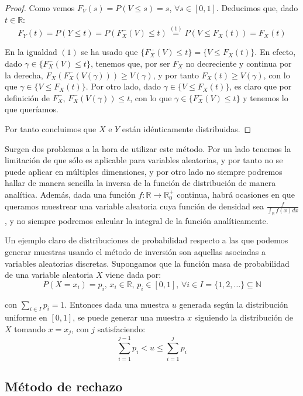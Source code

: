 \begin{proof}
Como vemos $F_V(s) = P(V\leq s) = s$, $\forall s\in [0,1]$. Deducimos que, dado $t\in \mathds{R}$:
$$F_Y(t) = P(Y\leq t) = P(F_X^-(V)\leq t) \overset{(1)}{=} P(V\leq F_X(t)) = F_X(t)$$

En la igualdad $(1)$ se ha usado que $\{F_X^-(V)\leq t\} = \{V\leq F_X(t)\}$. En efecto, dado $\gamma \in \{F_X^-(V)\leq t\}$, tenemos que, por ser $F_X$ no decreciente y continua por la derecha, $F_X(F_X^-(V(\gamma)))\geq V(\gamma)$, y por tanto $F_X(t)\geq V(\gamma)$, con lo que $\gamma\in \{V\leq F_X(t)\}$. Por otro lado, dado $\gamma \in \{V\leq F_X(t)\}$, es claro que por definición de $F_X^-$, $F_X^-(V(\gamma))\leq t$, con lo que $\gamma \in \{F_X^-(V)\leq t\}$ y tenemos lo que queríamos.

Por tanto concluimos que $X$ e $Y$ están idénticamente distribuidas.

\end{proof}

Surgen dos problemas a la hora de utilizar este método. Por un lado tenemos la limitación de que sólo es aplicable para variables aleatorias, y por tanto no se puede aplicar en múltiples dimensiones, y por otro lado no siempre podremos hallar de manera sencilla la inversa de la función de distribución de manera analítica. Además, dada una función $f:\mathds{R}\rightarrow \mathds{R}_0^+$ continua, habrá ocasiones en que queramos muestrear una variable aleatoria cuya función de densidad sea $\frac{f}{\int_{\mathds{R}}f(x)dx}$, y no siempre podremos calcular la integral de la función analíticamente.

\begin{ejemplo}
Un ejemplo claro de distribuciones de probabilidad respecto a las que podemos generar muestras usando el método de inversión son aquellas asociadas a variables aleatorias discretas. Supongamos que la función masa de probabilidad de una variable aleatoria $X$ viene dada por:
$$P(X=x_i) = p_i\text{, }x_i\in\mathds{R} \text{, }p_i\in [0,1]\text{, }\forall i\in I=\{1,2,\ldots \}\subseteq\mathds{N}$$

con $\sum_{i\in I}p_i = 1$. Entonces dada una muestra $u$ generada según la distribución uniforme en $[0,1]$, se puede generar una muestra $x$ siguiendo la distribución de $X$ tomando $x=x_j$, con $j$ satisfaciendo:
$$\sum_{i=1}^{j-1}p_i < u \leq \sum_{i=1}^jp_i$$
\end{ejemplo}

\subsection{Método de rechazo}

